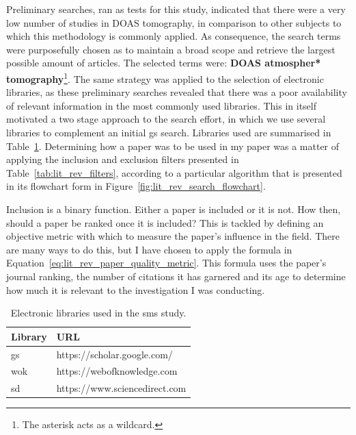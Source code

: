 Preliminary searches, ran as tests for this study, indicated that there
were a very low number of studies in \gls{DOAS} tomography, in
comparison to other subjects to which this methodology is commonly
applied. As consequence, the search terms were purposefully chosen as to
maintain a broad scope and retrieve the largest possible amount of
articles. The selected terms were: \textbf{DOAS atmospher*
tomography}\footnote{The asterisk acts as a wildcard.}. The same
strategy was applied to the selection of electronic libraries, as these
preliminary searches revealed that there was a poor availability of
relevant information in the most commonly used libraries. This in itself
motivated a two stage approach to the search effort, in which we use
several libraries to complement an initial \gls{gs} search. Libraries
used are summarised in Table~\ref{tab:lit_rev_libraries}. Determining
how a paper was to be used in my paper was a matter of applying the
inclusion and exclusion filters presented in
Table~\ref{tab:lit_rev_filters}, according to a particular algorithm
that is presented in its flowchart form in
Figure~\ref{fig:lit_rev_search_flowchart}. 

Inclusion is a binary function. Either a paper is included or it is not.
How then, should a paper be ranked once it is included? This is tackled
by defining an objective metric with which to measure the paper's
influence in the field. There are many ways to do this, but I have
chosen to apply the formula in
Equation~\ref{eq:lit_rev_paper_quality_metric}. This formula uses the
paper's journal ranking, the number of citations it has garnered and its
age to determine how much it is relevant to the investigation I was
conducting.

\begin{table}[htb]
\centering
\caption{Electronic libraries used in the \gls{sms} study.}
\label{tab:lit_rev_libraries}
\begin{tabularx}{\textwidth}{ll}
\toprule
\textbf{Library}          & \textbf{URL}\\
\midrule
\gls{gs}   & https://scholar.google.com/\\
\gls{wok}& https://webofknowledge.com\\
\gls{sd}   & https://www.sciencedirect.com\\
\bottomrule
\end{tabularx}
\end{table}

